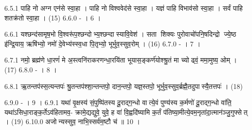 6.5.1
पाहि नो अग्न एन॑से स्वा॒हा । पाहि नो विश्ववेद॑से स्वा॒हा । यज्ञं पाहि विभाव॑सो स्वा॒हा । सर्वं पाहि शतक्र॑तो स्वा॒हा । (15)
6.6.0
- । 6 ।
\anuvakamend

6.6.1
यश्छन्द॑सामृष॒भो वि॒श्वरू॑प॒श्छन्दोभ्य॒श्छन्दास्यावि॒वेश॑ । सता शिक्यः पुरोवाचो॑पनि॒षदिन्द्रो ज्ये॒ष्ठ इ॑न्द्रि॒याय॒ ऋषि॑भ्यो॒ नमो॑ दे॒वेभ्य॑स्स्व॒धा पि॒तृभ्यो॒ भूर्भुव॒स्सुव॒रोम् । (16)
6.7.0
- । 7 ।
\anuvakamend

6.7.1
नमो॒ ब्रह्म॑णे धा॒रणं॑ मे अ॒स्त्वनि॑राकरणन्धा॒रयि॑ता भूयास॒ङ्कर्ण॑योश्श्रु॒तं मा च्योढ्वं॒ ममा॒मुष्य॒ ओम् । (17)
6.8.0
- । 8 ।
\anuvakamend

6.8.1
ऋ॒तन्तप॑स्स॒त्यन्तपः॑ श्रु॒तन्तप॑श्शा॒न्तन्तपो॒ दान॒न्तपो॒ यज्ञ॒स्तपो॒ भूर्भुव॒स्सुव॒र्ब्रह्मै॒तदुपास्यै॒तत्तपः॑ । (18)
\anuvakamend

6.9.0
- । 9 ।
6.9.1
यथा॑ वृ॒क्षस्य॑ सं॒पुष्पि॑तस्य दू॒राद्ग॒न्धो वात्ये॒वं पुण्य॑स्य क॒र्मणो॑ दू॒राद्ग॒न्धो वा॑ति॒ यथा॑ऽसिधा॒राङ्क॒र्तेऽव॑हितामव॒- क्रामे॒द्यद्युवे॒ युवे॒ ह वा॑ वि॒ह्वदि॑ष्यामि क॒र्तं प॑तिष्या॒मीत्ये॒वम॒नृता॑दा॒त्मान॑ञ्जु॒गुफ्सेत् । (19)
6.10.0
अजोन्यस्सुव॒ नाभि॒स्सर्व॑म॒ष्टौ च॑ ॥ 10 ।
\anuvakamend

